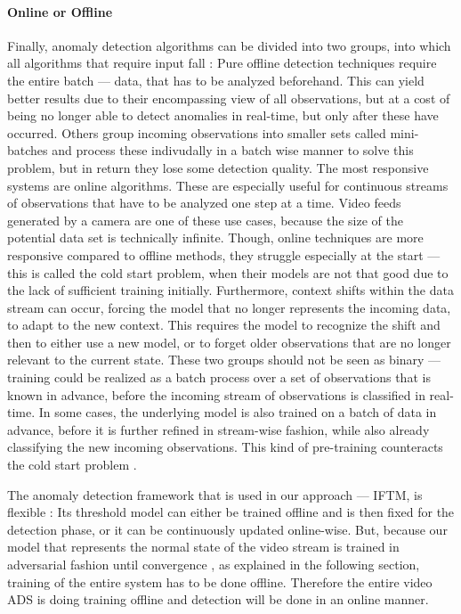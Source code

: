 \paragraph{Online or Offline} \label{par:online_offline}
Finally, anomaly detection algorithms can be divided into two groups, into which all algorithms that require input fall \cite{karp1992line}: Pure offline detection techniques require the entire batch --- data, that has to be analyzed beforehand. This can yield better results due to their encompassing view of all observations, but at a cost of being no longer able to detect anomalies in real-time, but only after these have occurred. Others group incoming observations into smaller sets called mini-batches and process these indivudally in a batch wise manner to solve this problem, but in return they lose some detection quality. The most responsive systems are online algorithms. These are especially useful for continuous streams of observations that have to be analyzed one step at a time. Video feeds generated by a camera are one of these use cases, because the size of the potential data set is technically infinite. Though, online techniques are more responsive compared to offline methods, they struggle especially at the start --- this is called the cold start problem, when their models are not that good due to the lack of sufficient training initially. Furthermore, context shifts within the data stream can occur, forcing the model that no longer represents the incoming data, to adapt to the new context. This requires the model to recognize the shift and then to either use a new model, or to forget older observations that are no longer relevant to the current state. These two groups should not be seen as binary --- training could be realized as a batch process over a set of observations that is known in advance, before the incoming stream of observations is classified in real-time. In some cases, the underlying model is also trained on a batch of data in advance, before it is further refined in stream-wise fashion, while also already classifying the new incoming observations. This kind of pre-training counteracts the cold start problem \cite{erhan2010does}.

The anomaly detection framework that is used in our approach --- IFTM, is flexible \cite{schmidt2018iftm}: Its threshold model can either be trained offline and is then fixed for the detection phase, or it can be continuously updated online-wise. But, because our model that represents the normal state of the video stream is trained in adversarial fashion until convergence \cite{goodfellow2014generative}, as explained in the following section, training of the entire system has to be done offline. Therefore the entire video ADS is doing training offline and detection will be done in an online manner.



